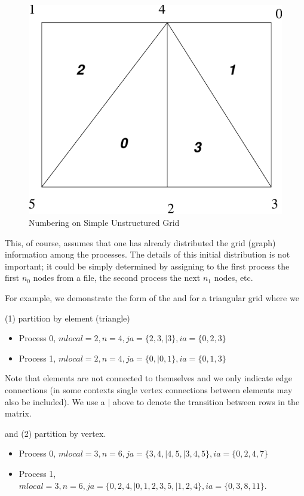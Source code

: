 \begin{figure}[H]
\centerline{ \includegraphics{usg.pdf}}
\caption{Numbering on Simple Unstructured Grid}
\label{fig_usg}
\end{figure}

This, of course, assumes that one has already distributed the grid (graph) information
among the processes. The details of this initial distribution is not important; it 
could be simply determined by assigning to the first process the first $n_0$ nodes
from a file, the second process the next $ n_1$ nodes, etc.

For example, we demonstrate the form of the  and  for a triangular
grid where we 

(1) partition by element (triangle) 
\begin{itemize}
  \item Process 0, $ mlocal = 2, n = 4, ja = \{2, 3,| 3\}, ia = \{0, 2, 3\} $
  \item Process 1, $ mlocal = 2, n = 4, ja = \{0, | 0, 1\}, ia = \{0, 1, 3\} $
\end{itemize}
Note that elements are not connected to themselves and we only indicate edge connections
(in some contexts single vertex connections between elements may also be included). We use a
$ | $ above to denote the transition between rows in the matrix.

and (2) partition by vertex.
\begin{itemize}
  \item Process 0, $ mlocal = 3, n = 6, ja = \{3, 4, | 4, 5, | 3, 4, 5\}, ia = \{0, 2, 4, 7\} $
  \item Process 1, $ mlocal = 3, n = 6, ja = \{0, 2, 4, |  0, 1, 2, 3, 5,|  1, 2, 4\}, ia = \{0, 3, 8, 11\}. $
\end{itemize}



